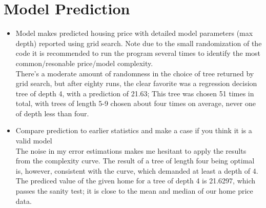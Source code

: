 \documentclass{amsart}
\begin{document}
\section{Model Prediction}
\begin{itemize}
	\item Model makes predicted housing price with detailed model parameters (max depth) reported using grid search.  Note due to the small randomization of the code it is recommended to run the program several times to identify the most common/resonable price/model complexity.\vspace{1mm} \\
		There's a moderate amount of randomness in the choice of tree returned by grid search, but after eighty runs, the clear favorite was a regression decision tree of depth 4, with a prediction of 21.63; This tree was chosen 51 times in total, with trees of length 5-9 chosen about four times on average, never one of depth less than four. \vspace{1mm} 
	\item Compare prediction to earlier statistics and make a case if you think it is a valid model \vspace{1mm}\\
		The noise in my error estimations makes me hesitant to apply the results from the complexity curve.  The result of a tree of length four being optimal is, however, consistent with the curve, which demanded at least a depth of 4.  The prediced value of the given home for a tree of depth 4 is 21.6297, which passes the sanity test; it is close to the mean and median of our home price data.  
\end{itemize}
\end{document}
